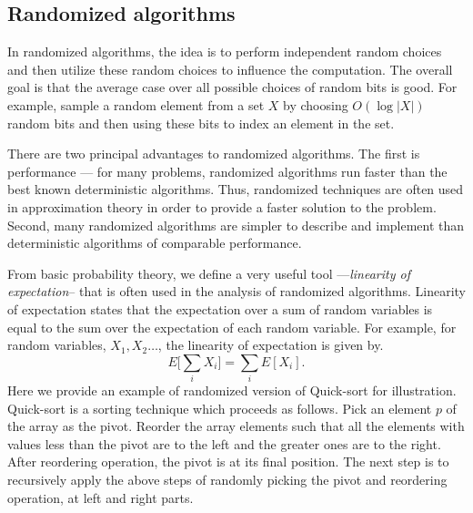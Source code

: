 \subsection{Randomized algorithms}
In randomized algorithms, the idea is to perform independent random choices and then utilize these random choices to influence the computation.
The overall goal is that the average case over all possible choices of random bits is good.
For example, sample a random element from a set $X$ by choosing $O(\log |X|)$ random bits and then using these
bits to index an element in the set. 

There are two principal advantages to randomized algorithms. The first is performance --- for many problems, 
randomized algorithms run faster than the best known deterministic algorithms.
Thus, randomized techniques are often used in approximation theory in order to provide a faster solution to the problem.
Second, many randomized algorithms are simpler to describe and implement than deterministic algorithms of
comparable performance. 

From basic probability theory, we define a very useful tool ---\textit{linearity of expectation}-- that is often used in the analysis of randomized algorithms.
Linearity of expectation states that the expectation over a sum of random variables is equal to the sum over the expectation of each random variable.
For example, for random variables, $X_1, X_2 \ldots$, the linearity of expectation is given by.
\begin{equation}
 E\big[\sum_i X_i\big] = \sum_i E[X_i].
\end{equation}
Here we provide an example of randomized version of Quick-sort for illustration. 
Quick-sort is a sorting technique which proceeds as follows.
Pick an element $p$ of the array as the pivot.
Reorder the array elements such that all the elements with values less than the pivot are to the left and the greater ones are to the right. After reordering operation, the pivot is at its final position.
The next step is to recursively apply the above steps of randomly picking the pivot and reordering operation, at left and right parts.

